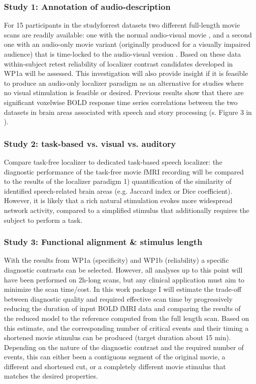 \subsubsection{Study 1: Annotation of audio-description}

For 15 participants in the studyforrest datasets two different full-length movie
scans are readily available: one with the normal audio-visual movie
\citep{hanke2016simultaneous}, and a second one with an audio-only movie variant
(originally produced for a visually impaired audience) that is time-locked to
the audio-visual version \citep{hanke2014audiomovie}.
%
Based on these data within-subject retest reliability of localizer contrast
candidates developed in WP1a will be assessed.
%
This investigation will also provide insight if it is feasible to produce an
audio-only localizer paradigm as an alternative for studies where no visual
stimulation is feasible or desired.
%
Previous results show that there are significant voxelwise BOLD response time
series correlations between the two datasets in brain areas associated with
speech and story processing (s. Figure 3 in \citep{hanke2016simultaneous}).


\subsubsection{Study 2: task-based vs. visual vs. auditory}
%
Compare task-free localizer to dedicated task-based speech localizer:
%
the diagnostic performance of the task-free movie fMRI
recording will be compared to the results of the localizer paradigm
%
1) quantification of the similarity of identified speech-related brain areas
(e.g. Jaccard index or Dice coefficient).
%
However, it is likely that a rich natural stimulation evokes more widespread
network activity, compared to a simplified stimulus that additionally requires
the subject to perform a task.


\subsubsection{Study 3: Functional alignment \& stimulus length}
%
With the results from WP1a (specificity) and WP1b (reliability) a specific
diagnostic contrasts can be selected.
%
However, all analyses up to this point will have been performed on 2h-long
scans, but any clinical application must aim to minimize the scan time/cost.
%
In this work package I will estimate the trade-off between diagnostic quality
and required effective scan time by progressively reducing the duration of input
BOLD fMRI data and comparing the results of the reduced model to the reference
computed from the full length scan.
%
Based on this estimate, and the corresponding number of critical events and
their timing a shortened movie stimulus can be produced (target duration about
15 min).
%
Depending on the nature of the diagnostic contrast and the required number
of events, this can either been a contiguous segment of the original movie, a
different and shortened cut, or a completely different movie stimulus that
matches the desired properties.

